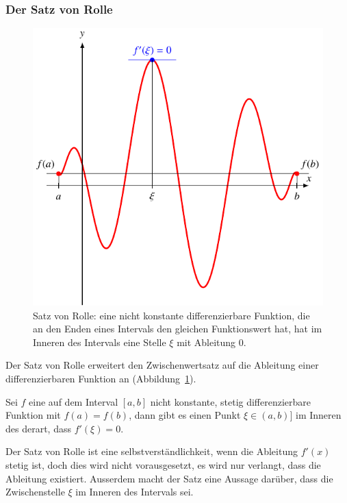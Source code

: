 \subsubsection{Der Satz von Rolle}
\begin{figure}
\centering
\includegraphics{chapters/30-interpolation/figures/rolle.pdf}
\caption{Satz von Rolle: eine nicht konstante differenzierbare Funktion,
die an den Enden eines Intervals den gleichen Funktionswert hat, hat im 
Inneren des Intervals eine Stelle $\xi$ mit Ableitung $0$.
\label{buch:figure:rolle}}
\end{figure}
Der Satz von Rolle erweitert den Zwischenwertsatz auf die Ableitung einer
differenzierbaren Funktion an (Abbildung~\ref{buch:figure:rolle}).

\begin{satz}[Rolle]
\label{buch:satz:rolle}
Sei $f$ eine auf dem Interval $[a,b]$ nicht konstante,
stetig differenzierbare Funktion
mit $f(a)=f(b)$, dann gibt es einen Punkt $\xi\in(a,b)]$ im Inneren
des derart, dass $f'(\xi)=0$.
\end{satz}

Der Satz von Rolle ist eine selbstverständlichkeit, wenn die Ableitung
$f'(x)$ stetig ist, doch dies wird nicht vorausgesetzt, es wird nur
verlangt, dass die Ableitung existiert.
Ausserdem macht der Satz eine Aussage darüber, dass die Zwischenstelle
$\xi$ im Inneren des Intervals sei.

